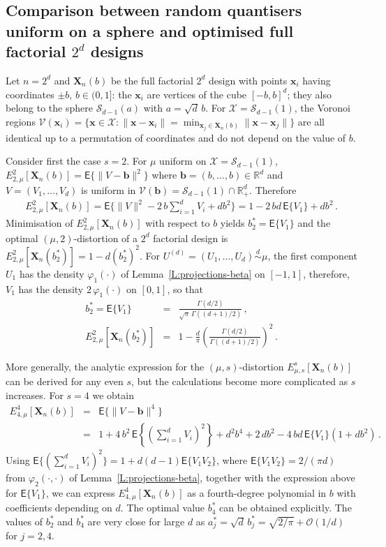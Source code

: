 \documentclass{article}
\def\RR{\mathds{R}}
\def\SX{{\mathscr X}}
\def\xb{\mathbf{x}}
\def\Xb{\mathbf{X}}
\def\Ex{\mathsf{E}}
\def\simd{\stackrel{d}{\sim}}
\def\SS{{\mathcal S}}
\newcommand{\bea}{\begin{eqnarray*}}
\newcommand{\eea}{\end{eqnarray*}}
\def\SO{{\mathcal O}}
\def\SV{\mathscr{V}}
\def\bb{\mathbf{b}}
\begin{document}
\subsection{Comparison between random quantisers uniform on a sphere and optimised full factorial $2^d$ designs} \label{S:sphere-2^d}
Let $n=2^d$ and $\Xb_n(b)$ be the full factorial $2^d$ design with points $\xb_i$ having coordinates $\pm b$, $b\in(0,1]$: the $\xb_i$ are vertices of the cube $[-b,b]^d$; they also belong to the sphere $\SS_{d-1}(a)$ with $a=\sqrt{d}\,b$. For $\SX=\SS_{d-1}(1)$, the Voronoi regions $\SV(\xb_i)=\{\xb\in\SX: \|\xb-\xb_i\| = \min_{\xb_j\in\Xb_n(b)} \|\xb-\xb_j\|\}$ are all identical up to a permutation of coordinates and do not depend on the value of $b$.

Consider first the case $s=2$. For $\mu$ uniform on $\SX=\SS_{d-1}(1)$, $E_{2,\mu}^2[\Xb_n(b)]=\Ex\{\|V-\bb\|^2\}$ where $\bb=(b,\ldots,b)\in\RR^d$ and $V=(V_1,\ldots,V_d)$ is uniform in $\SV(\bb)=\SS_{d-1}(1)\cap \RR_+^d$. Therefore
\bea
E_{2,\mu}^2[\Xb_n(b)]= \Ex\{ \|V\|^2 - 2\,b\sum_{i=1}^d  V_i + d b^2\} = 1 - 2\,bd\, \Ex\{V_1\} + db^2 \,.
\eea
Minimisation of $E_{2,\mu}^2[\Xb_n(b)]$ with respect to $b$ yields $b_2^*=\Ex\{V_1\}$ and the optimal $(\mu,2)$-distortion of a $2^d$ factorial design is $E_{2,\mu}^2[\Xb_n(b_2^*)]=1-d (b_2^*)^2$.
For $U^{(d)}=(U_1,\ldots,U_d)\simd \mu$, the first component $U_1$ has the density $\varphi_1(\cdot)$ of Lemma~\ref{L:projections-beta} on $[-1,1]$, therefore, $V_1$ has the density $2\,\varphi_1(\cdot)$ on $[0,1]$, so that
\bea
b_2^* =\Ex\{V_1\} &=& \frac{\Gamma(d/2)}{\sqrt{\pi}\,\Gamma((d+1)/2)}\,, \\
E_{2,\mu}^2[\Xb_n(b_2^*)] &=& 1 - \frac{d}{\pi} \left(\frac{\Gamma(d/2)}{\Gamma((d+1)/2)}\right)^2 \,.
\eea

More generally, the analytic expression for the $(\mu,s)$-distortion $E_{\mu,s}^s[\Xb_n(b)]$ can be derived for any even $s$, but the calculations become more complicated as $s$ increases. For $s=4$ we obtain
\bea
E_{4,\mu}^4[\Xb_n(b)] &=& \Ex\{\|V-\bb\|^4\} \\
&=& 1 +4\,b^2\, \Ex\left\{\left(\sum_{i=1}^d V_i \right)^2\right\} + d^2 b^4 + 2\,d b^2 - 4\, bd\, \Ex\{V_1\} (1+d b^2) \,.
\eea
Using $\Ex\{(\sum_{i=1}^d V_i)^2\}=1+d(d-1) \Ex\{V_1V_2\}$, where $\Ex\{V_1V_2\}=2/(\pi d)$ from $\varphi_2(\cdot,\cdot)$ of Lemma~\ref{L:projections-beta}, together with the expression above for $\Ex\{V_1\}$, we can express $E_{4,\mu}^4[\Xb_n(b)]$ as a fourth-degree polynomial in $b$ with coefficients depending on $d$. The optimal value $b_4^*$ can be obtained explicitly.
The values of $b_2^*$ and $b_4^*$ are very close for large $d$ as $a_j^*=\sqrt{d}\,b_j^*=\sqrt{2/\pi}+\SO(1/d)$ for $j=2,4$.
\end{document}
